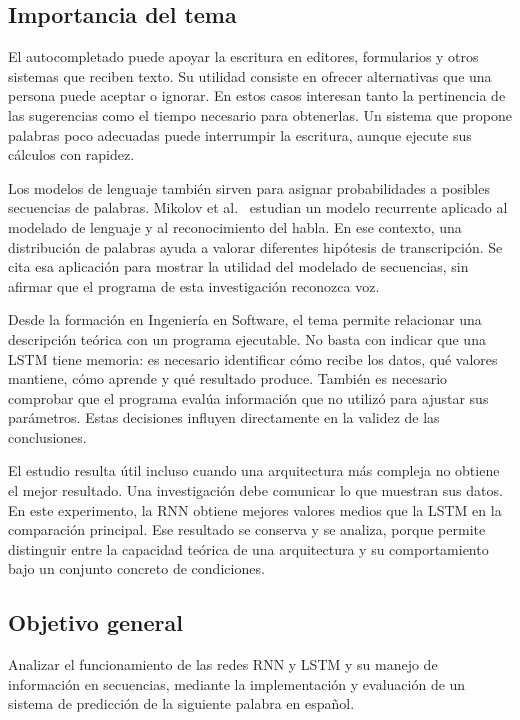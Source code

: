 \subsection{Importancia del tema}
El autocompletado puede apoyar la escritura en editores, formularios y otros sistemas que reciben texto. Su utilidad consiste en ofrecer alternativas que una persona puede aceptar o ignorar. En estos casos interesan tanto la pertinencia de las sugerencias como el tiempo necesario para obtenerlas. Un sistema que propone palabras poco adecuadas puede interrumpir la escritura, aunque ejecute sus cálculos con rapidez.

Los modelos de lenguaje también sirven para asignar probabilidades a posibles secuencias de palabras. Mikolov et al.~\cite{mikolov2010} estudian un modelo recurrente aplicado al modelado de lenguaje y al reconocimiento del habla. En ese contexto, una distribución de palabras ayuda a valorar diferentes hipótesis de transcripción. Se cita esa aplicación para mostrar la utilidad del modelado de secuencias, sin afirmar que el programa de esta investigación reconozca voz.

Desde la formación en Ingeniería en Software, el tema permite relacionar una descripción teórica con un programa ejecutable. No basta con indicar que una LSTM tiene memoria: es necesario identificar cómo recibe los datos, qué valores mantiene, cómo aprende y qué resultado produce. También es necesario comprobar que el programa evalúa información que no utilizó para ajustar sus parámetros. Estas decisiones influyen directamente en la validez de las conclusiones.

El estudio resulta útil incluso cuando una arquitectura más compleja no obtiene el mejor resultado. Una investigación debe comunicar lo que muestran sus datos. En este experimento, la RNN obtiene mejores valores medios que la LSTM en la comparación principal. Ese resultado se conserva y se analiza, porque permite distinguir entre la capacidad teórica de una arquitectura y su comportamiento bajo un conjunto concreto de condiciones.

\subsection{Objetivo general}
Analizar el funcionamiento de las redes RNN y LSTM y su manejo de información en secuencias, mediante la implementación y evaluación de un sistema de predicción de la siguiente palabra en español.

